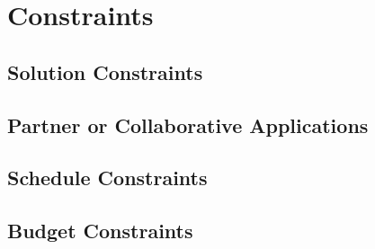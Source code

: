 \chapter{Constraints}

\section{Solution Constraints}

\section{Partner or Collaborative Applications}

\section{Schedule Constraints}

\section{Budget Constraints}
